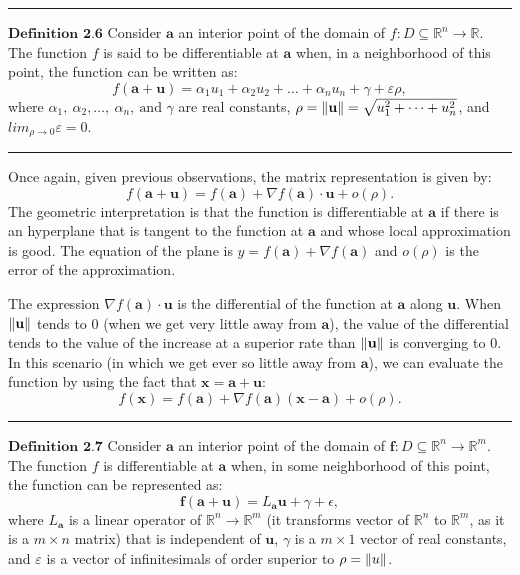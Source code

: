 \documentclass[0pt, a4paper]{article}
\begin{document}
\noindent\rule{\textwidth}{1pt}

$\textbf{Definition 2.6}$ Consider $\textbf{a}$ an interior point of the domain of $f:D\subseteq\mathbb{R}^n\to\mathbb{R}$. The function $f$ is said to be differentiable at $\textbf{a}$ when, in a neighborhood of this point, the function can be written as:
$$f(\textbf{a}+\textbf{u})=\alpha_1u_1+\alpha_2u_2+\dots+\alpha_nu_n+\gamma+\varepsilon\rho,$$
where $\alpha_1,\ \alpha_2,\dots,\ \alpha_n,\ \text{and }\gamma$ are real constants, $\rho=\norm{\textbf{u}}=\sqrt{u_1^2+\dots+u_n^2}$, and $lim_{\rho\to0}\varepsilon=0$.

\noindent\rule{\textwidth}{1pt}

Once again, given previous observations, the matrix representation is given by:
$$f(\textbf{a}+\textbf{u})=f(\textbf{a})+\nabla f(\textbf{a})\cdot\textbf{u}+o(\rho).$$
The geometric interpretation is that the function is differentiable at $\textbf{a}$ if there is an hyperplane that is tangent to the function at $\textbf{a}$ and whose local approximation is good. The equation of the plane is $y=f(\textbf{a})+\nabla f(\textbf{a})$ and $o(\rho)$ is the error of the approximation.

The expression $\nabla f(\textbf{a})\cdot\textbf{u}$ is the differential of the function at $\textbf{a}$ along $\textbf{u}$. When $\norm{\textbf{u}}$ tends to $0$ (when we get very little away from $\textbf{a}$), the value of the differential tends to the value of the increase at a superior rate than $\norm{\textbf{u}}$ is converging to $0$. In this scenario (in which we get ever so little away from $\textbf{a}$), we can evaluate the function by using the fact that $\textbf{x}=\textbf{a}+\textbf{u}$:
$$f(\textbf{x})=f(\textbf{a})+\nabla f(\textbf{a})(\textbf{x}-\textbf{a})+o(\rho).$$

\noindent\rule{\textwidth}{1pt}

$\textbf{Definition 2.7}$ Consider $\textbf{a}$ an interior point of the domain of $\textbf{f}:D\subseteq\mathbb{R}^n\to\mathbb{R}^m$. The function $f$ is differentiable at $\textbf{a}$ when, in some neighborhood of this point, the function can be represented as:
$$\textbf{f}(\textbf{a}+\textbf{u})=L_\textbf{a}\textbf{u}+\gamma+\epsilon,$$
where $L_\textbf{a}$ is a linear operator of $\mathbb{R}^n\to\mathbb{R}^m$ (it transforms vector of $\mathbb{R}^n$ to $\mathbb{R}^m$, as it is a $m\times n$ matrix) that is independent of $\textbf{u}$, $\gamma$ is a $m\times1$ vector of real constants, and $\varepsilon$ is a vector of infinitesimals of order superior to $\rho=\norm{u}$.
\end{document}
